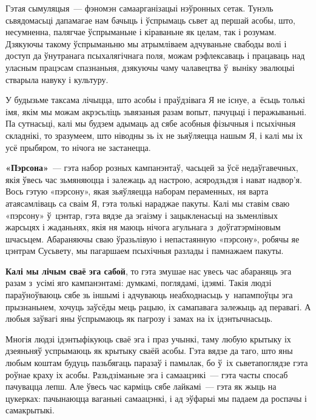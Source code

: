 Гэтая сымуляцыя~--- фэномэн самаарганізацыі нэўронных сетак. Тунэль сьвядомасьці дапамагае нам бачыць і ўспрымаць сьвет ад першай асобы, што, несумненна, палягчае ўспрыманьне і кіраваньне як целам, так і розумам. Дзякуючы такому ўспрыманьню мы атрымліваем адчуваньне свабоды волі і доступ да ўнутранага псыхалягічнага поля, можам рэфлексаваць і працаваць над уласным працэсам спазнаньня, дзякуючы чаму чалавецтва ў~выніку эвалюцыі стварыла навуку і культуру.

У будызьме таксама лічыцца, што асобы і праўдзівага Я не існуе, а~ёсьць толькі імя, якім мы можам акрэсьліць зьвязаныя разам вопыт, пачуцьці і перажываньні. Па сутнасьці, калі мы будзем адымаць ад сябе асобныя фізычныя і псыхічныя складнікі, то зразумеем, што ніводны зь іх не зьяўляецца нашым Я, і калі мы іх усё прыбяром, то нічога не застанецца.


\textbf{«Пэрсона»}~--- гэта набор розных кампанэнтаў, часьцей за ўсё недаўгавечных, якія ўвесь час зьмяняюцца і залежаць ад настрою, асяродзьдзя і нават надвор'я. Вось гэтую «пэрсону», якая зьяўляецца наборам пераменных, ня варта атаясамліваць са сваім Я, гэта толькі нараджае пакуты. Калі мы ставім сваю «пэрсону» ў~цэнтар, гэта вядзе да эгаізму і зацыкленасьці на зьменлівых жарсьцях і жаданьнях, якія ня маюць нічога агульнага з~доўгатэрміновым шчасьцем. Абараняючы сваю ўразьлівую і непастаянную «пэрсону», робячы яе цэнтрам Сусьвету, мы пагаршаем псыхічныя разлады і памнажаем пакуты.

\textbf{Калі мы лічым сваё эга сабой}, то гэта змушае нас увесь час абараняць эга разам з~усімі яго кампанэнтамі: думкамі, поглядамі, ідэямі. Такія людзі параўноўваюць сябе зь іншымі і адчуваюць неабходнасьць у~напампоўцы эга прызнаньнем, хочуць заўсёды мець рацыю, іх самапавага залежыць ад перавагі. А любыя заўвагі яны ўспрымаюць як пагрозу і замах на іх ідэнтычнасьць.


Многія людзі ідэнтыфікуюць сваё эга і праз учынкі, таму любую крытыку іх дзеяньняў успрымаюць як крытыку сваёй асобы. Гэта вядзе да таго, што яны любым коштам будуць пазьбягаць паразаў і памылак, бо ў~іх сьветапоглядзе гэта роўнае краху іх асобы. Разьдзіманьне эга і самаацэнкі~--- гэта часты спосаб пачувацца лепш. Але ўвесь час карміць сябе лайкамі~--- гэта як жыць на цукерках: пачынаюцца ваганьні самаацэнкі, і ад эўфарыі мы падаем да роспачы і самакрытыкі.

